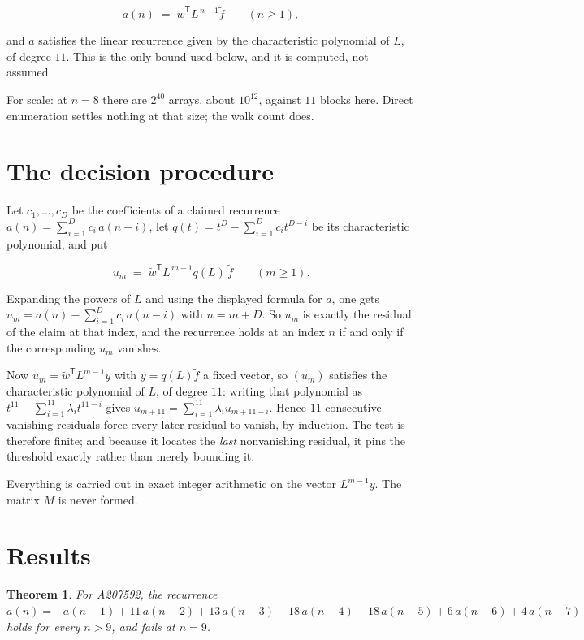 \documentclass[11pt]{article}
\newtheorem{theorem}{Theorem}
\theoremstyle{definition}
\begin{document}
\[a(n) \;=\; \tilde w^{\mathsf T} L^{\,n-1} \tilde f \qquad (n \ge 1),\]

and $a$ satisfies the linear recurrence given by the characteristic polynomial of $L$, of degree $11$. This is the only bound used below, and it is computed, not assumed.

For scale: at $n = 8$ there are $2^{40}$ arrays, about $10^{12}$, against $11$ blocks here. Direct enumeration settles nothing at that size; the walk count does.

\section{The decision procedure}

Let $c_1,\dots,c_D$ be the coefficients of a claimed recurrence $a(n) = \sum_{i=1}^{D} c_i\,a(n-i)$, let $q(t) = t^{D} - \sum_{i=1}^{D} c_i t^{D-i}$ be its characteristic polynomial, and put

\[u_m \;=\; \tilde w^{\mathsf T} L^{\,m-1} q(L)\,\tilde f \qquad (m \ge 1).\]

Expanding the powers of $L$ and using the displayed formula for $a$, one gets $u_m = a(n) - \sum_{i=1}^{D} c_i\,a(n-i)$ with $n = m + D$. So $u_m$ is exactly the residual of the claim at that index, and the recurrence holds at an index $n$ if and only if the corresponding $u_m$ vanishes.

Now $u_m = \tilde w^{\mathsf T} L^{m-1} y$ with $y = q(L)\tilde f$ a fixed vector, so $(u_m)$ satisfies the characteristic polynomial of $L$, of degree $11$: writing that polynomial as $t^{11} - \sum_{i=1}^{11} \lambda_i t^{11-i}$ gives $u_{m+11} = \sum_{i=1}^{11} \lambda_i u_{m+11-i}$. Hence $11$ consecutive vanishing residuals force every later residual to vanish, by induction. The test is therefore finite; and because it locates the {\itshape last} nonvanishing residual, it pins the threshold exactly rather than merely bounding it.

Everything is carried out in exact integer arithmetic on the vector $L^{m-1}y$. The matrix $M$ is never formed.

\section{Results}

\begin{theorem} For A207592, the recurrence $a(n) = -a(n-1) + 11\,a(n-2) + 13\,a(n-3) - 18\,a(n-4) - 18\,a(n-5) + 6\,a(n-6) + 4\,a(n-7)$ holds for every $n > 9$, and fails at $n = 9$.\end{theorem}
\end{document}
